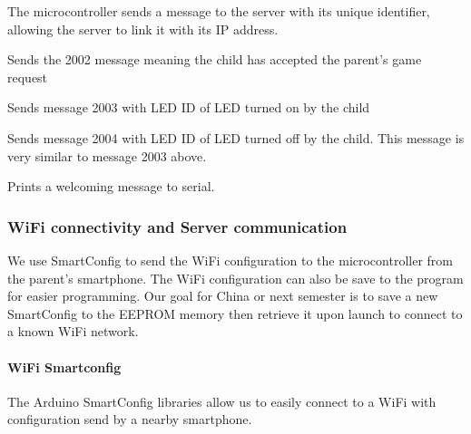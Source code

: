 \begin{description}[align=left]
\item[first\_message] The microcontroller sends a message to the server with its unique identifier, allowing the server to link it with its IP address.

\item[accept\_game\_message] Sends the 2002 message meaning the child has accepted the parent's game request

\item[LED\_on\_message] Sends message 2003 with LED ID of LED turned on by the child

\item[LED\_off\_message] Sends message 2004 with LED ID of LED turned off by the child. This message is very similar to message 2003 above. 
%
\item[hello] Prints a welcoming message to serial.
\end{description}


\subsubsection{WiFi connectivity and Server communication}\label{subsec:fw/Functions/WiFi}
We use SmartConfig to send the WiFi configuration to the microcontroller from the parent's smartphone. The WiFi configuration can also be save to the program for easier programming. 
Our goal for China or next semester is to save a new SmartConfig to the EEPROM memory then retrieve it upon launch to connect to a known WiFi network. 
    
\paragraph{WiFi Smartconfig}
The Arduino SmartConfig libraries allow us to easily connect to a WiFi with configuration send by a nearby smartphone.


%


